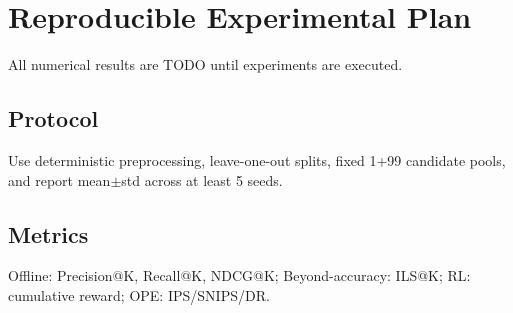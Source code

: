 \section{Reproducible Experimental Plan}
All numerical results are TODO until experiments are executed.

\subsection{Protocol}
Use deterministic preprocessing, leave-one-out splits, fixed 1+99 candidate pools, and report mean\(\pm\)std across at least 5 seeds.

\subsection{Metrics}
Offline: Precision@K, Recall@K, NDCG@K; Beyond-accuracy: ILS@K; RL: cumulative reward; OPE: IPS/SNIPS/DR.

